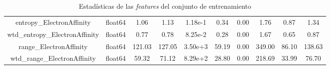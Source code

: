 \documentclass[11pt]{article}
\begin{document}
\begin{table}[H]
{\begin{tabular}{|c|c|c|c|c|c|c|c|c|c|}
entropy\_ElectronAffinity         & float64&     1.06&     1.13&  1.18e-1&     0.34&    0.00&      1.76&     0.87&     1.34 \\
wtd\_entropy\_ElectronAffinity     & float64&     0.77&     0.78&  8.25e-2&     0.28&    0.00&      1.67&     0.65&     0.87 \\
range\_ElectronAffinity           & float64&   121.03&   127.05&  3.50e+3&    59.19&    0.00&    349.00&    86.10&   138.63 \\
wtd\_range\_ElectronAffinity       & float64&    59.32&    71.12&  8.29e+2&    28.80&    0.00&    218.69&    33.99&    76.70 \\
    \hline
    \end{tabular}
    }
    \caption{Estadísticas de las \emph{features} del conjunto de entrenamiento}
    \label{Tabla con los estadísticos de las features 1}
\end{table}
\end{document}
